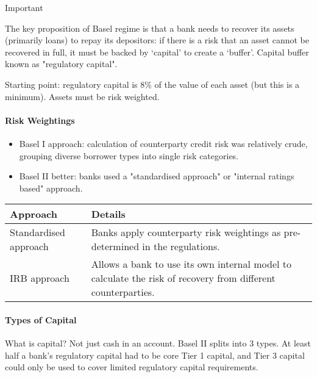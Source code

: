 \documentclass[
]{article}
\providecommand{\tightlist}{%
  \setlength{\itemsep}{0pt}\setlength{\parskip}{0pt}}
\newenvironment{env-02a65e52-3e2f-4e42-a1ad-a9c88e6d3852}
{
    \savenotes\tcolorbox[blanker,breakable,left=5pt,borderline west={2pt}{-4pt}{cyan}]
}
{
    \endtcolorbox\spewnotes
}
\begin{document}
\begin{env-02a65e52-3e2f-4e42-a1ad-a9c88e6d3852}

Important

The key proposition of Basel regime is that a bank needs to recover its
assets (primarily loans) to repay its depositors: if there is a risk
that an asset cannot be recovered in full, it must be backed by
`capital' to create a `buffer'. Capital buffer known as "regulatory
capital".

\end{env-02a65e52-3e2f-4e42-a1ad-a9c88e6d3852}

Starting point: regulatory capital is 8\% of the value of each asset
(but this is a minimum). Assets must be risk weighted.

\hypertarget{risk-weightings}{%
\paragraph{Risk Weightings}\label{risk-weightings}}

\begin{itemize}
\tightlist
\item
  Basel I approach: calculation of counterparty credit risk was
  relatively crude, grouping diverse borrower types into single risk
  categories.
\item
  Basel II better: banks used a "standardised approach" or "internal
  ratings based" approach.
\end{itemize}

\begin{longtable}[]{@{}ll@{}}
\toprule()
Approach & Details \\
\midrule()
\endhead
Standardised approach & Banks apply counterparty risk weightings as
pre-determined in the regulations. \\
IRB approach & Allows a bank to use its own internal model to calculate
the risk of recovery from different counterparties. \\
\bottomrule()
\end{longtable}

\hypertarget{types-of-capital}{%
\paragraph{Types of Capital}\label{types-of-capital}}

What is capital? Not just cash in an account. Basel II splits into 3
types. At least half a bank's regulatory capital had to be core Tier 1
capital, and Tier 3 capital could only be used to cover limited
regulatory capital requirements.
\end{document}
